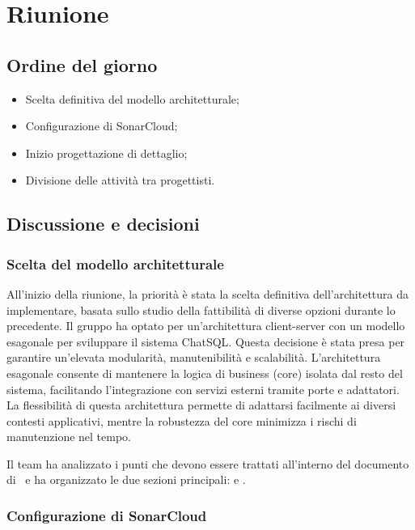 \section{Riunione}
\subsection{Ordine del giorno}
\begin{itemize}
	\item Scelta definitiva del modello architetturale;
	\item Configurazione di SonarCloud;
	\item Inizio progettazione di dettaglio;
	\item Divisione delle attività tra progettisti.
\end{itemize}

\subsection{Discussione e decisioni}
\subsubsection{Scelta del modello architetturale}
\par All'inizio della riunione, la priorità è stata la scelta definitiva dell'architettura da implementare, basata sullo studio della fattibilità di diverse opzioni durante lo  precedente. Il gruppo ha optato per un'architettura client-server con un modello esagonale per sviluppare il sistema ChatSQL. Questa decisione è stata presa per garantire un'elevata modularità, manutenibilità e scalabilità. L'architettura esagonale consente di mantenere la logica di business (core) isolata dal resto del sistema, facilitando l'integrazione con servizi esterni tramite porte e adattatori. La flessibilità di questa architettura permette di adattarsi facilmente ai diversi contesti applicativi, mentre la robustezza del core minimizza i rischi di manutenzione nel tempo.

\par Il team ha analizzato i punti che devono essere trattati all'interno del documento di \ST\ e ha organizzato le due sezioni principali:  e .

\subsubsection{Configurazione di SonarCloud}

